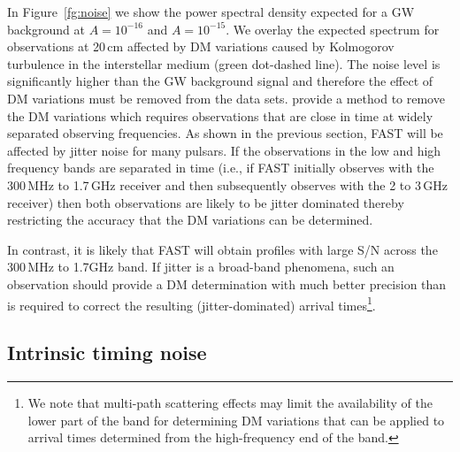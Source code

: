 \documentclass{raa}            %
\begin{document}
In Figure~\ref{fg:noise} we show the power spectral density expected for a GW background at $A = 10^{-16}$ and $A = 10^{-15}$.  We overlay the expected spectrum for observations at 20\,cm affected by DM variations caused by Kolmogorov turbulence in the interstellar medium (green dot-dashed line).  The noise level is significantly higher than the GW background signal and therefore the effect of DM variations must be removed from the data sets.  \cite{kcs+13} provide a method to remove the DM variations which requires observations that are close in time at widely separated observing frequencies. As shown in the previous section, FAST will be affected by jitter noise for many pulsars.  If the observations in the low and high frequency bands are separated in time (i.e., if FAST initially observes with the 300\,MHz to 1.7\,GHz receiver and then subsequently observes with the 2 to 3\,GHz receiver) then both observations are likely to be jitter dominated thereby restricting the accuracy that the DM variations can be determined.  

In contrast, it is likely that FAST will obtain profiles with large S/N across the 300\,MHz to 1.7GHz band.  If jitter is a broad-band phenomena, such an observation should provide a DM determination with much better precision than is required to correct the resulting (jitter-dominated) arrival times\footnote{We note that multi-path scattering effects may limit the availability of the lower part of the band for determining DM variations that can be applied to arrival times determined from the high-frequency end of the band.}.

\subsection{Intrinsic timing noise}
\end{document}

